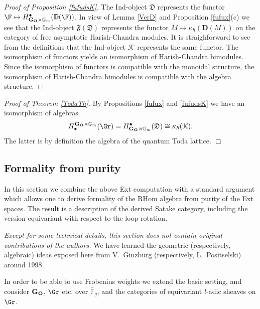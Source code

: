 \documentclass[11pt]{amsart}
\theoremstyle{definition}
\theoremstyle{remark}
\theoremstyle{remark}
\newcommand{\bu}{\bullet}
\newcommand{\<}{\langle}
\renewcommand{\>}{\rangle}
\newcommand{\GO}{{\bf G_O}}
\newcommand{\Gm}{{{\mathbb G}_m}}
\newcommand{\Fqbar}{{\bar{\mathbb F}_q}}
\newcommand{\fufu}{{\mathfrak{F}}}
\newcommand{\ds}{{\mathfrak D}}
\newcommand{\Ver}{{\mathbb D}}
\newcommand{\prd}{{\mathbf D}}
\newcommand{\psf}{{\kappa_\hbar}}
\newcommand{\cK}{{\mathcal K }}
\begin{document}
{\em Proof of  Proposition \ref{fufudsK}.} The Ind-object
$\ds$ represents the functor $\F\mapsto H^\bullet_{\GO\rtimes \Gm}(\Ver(\F))$.
In view of Lemma \ref{VerD} and Proposition \ref{fufux}(c)
we see that 
 the Ind-object $\fufu(\ds)$ represents the functor
$M\mapsto \psf(\prd (M))$ on the category of free asymptotic
Harish-Chandra modules. 
 It is straighforward to see from the definitions
that the Ind-object $\cK$ represents the same functor.
The isomorphism of functors yields an isomorphism of Harish-Chandra
bimodules. Since the isomorphism of functors is compatible with the
monoidal structure, the isomorphism of Harish-Chandra bimodules
is compatible with the algebra structure.
\hfill $\Box$

{\em Proof of Theorem \ref{TodaTh}.}
By Propositions \ref{fufux} and \ref{fufudsK} we have
an isomorphism of algebras
$$H^{\GO\rtimes \Gm}_\bu(\Gr)=H_{\GO\rtimes \Gm}^\bu(\ds)\cong
\psf(\cK).$$
The latter is by definition the algebra of the quantum Toda
lattice. \hfill $\Box$










\subsection{Formality from purity}
In this section we combine the above Ext computation with a standard argument
which allows one to derive formality of the RHom algebra from purity of the Ext
spaces. The result is a description of the derived Satake category, including
the version equivariant with respect to the loop rotation. 

{\em Except for some technical details, this section does not contain
original contributions of the authors.} We have learned the
geometric (respectively, algebraic) ideas exposed
here from V.~Ginzburg (respectively, L.~Positselski) around 1998.



In order to be able to use Frobenius weights we extend the basic setting,
and consider $\GO$, $\Gr$ etc. over $\Fqbar$, and the categories of
equivariant $l$-adic sheaves on $\Gr$. 
\end{document}
